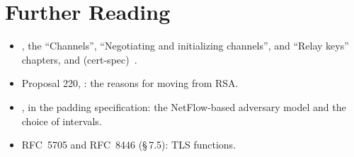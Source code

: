 \section*{Further Reading}
\begin{itemize}
  \item {}, the \enquote{Channels}, \enquote{Negotiating and initializing channels}, and \enquote{Relay keys} chapters, and  (cert-spec)~\cite{torspec}.
  \item Proposal 220, : the reasons for moving from RSA.
  \item {}, in the padding specification: the NetFlow-based adversary model and the choice of intervals.
  \item RFC~5705 and RFC~8446 (§\,7.5): TLS  functions.
\end{itemize}
